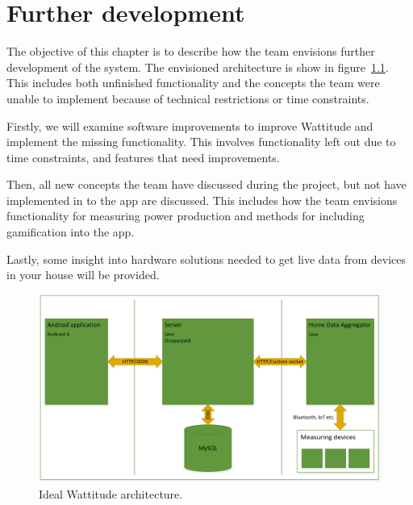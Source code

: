 \chapter{Further development}
\label{sec:further}
The objective of this chapter is to describe how the team envisions further development of the system. The envisioned architecture is show in figure~\ref{fig:idealArchitecture}. This includes both unfinished functionality and the concepts the team were unable to implement because of technical restrictions or time constraints.

Firstly, we will examine software improvements to improve Wattitude and implement the missing functionality. This involves functionality left out due to time constraints, and features that need improvements. 

Then, all new concepts the team have discussed during the project, but not have implemented in to the app are discussed. This includes how the team envisions functionality for measuring power production and methods for including gamification into the app. 

Lastly, some insight into hardware solutions needed to get live data from devices in your house will be provided. 

\begin{figure}[H]
\centering
\includegraphics[height=0.3\textheight]{ch/further/fig/architecture.png}
\caption{Ideal Wattitude architecture.}
\label{fig:idealArchitecture}
\end{figure}




